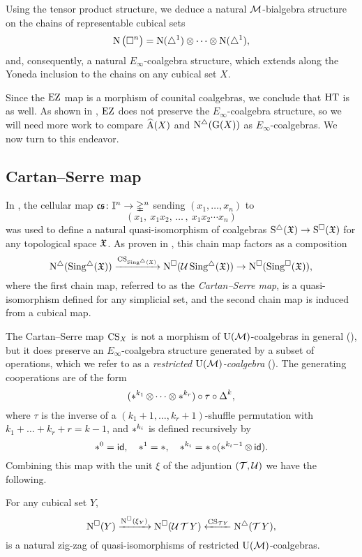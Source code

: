 Using the tensor product structure, we deduce a natural $\mathcal{M}$-bialgebra structure on the chains of representable cubical sets
\[
\operatorname{N}\big(\square^n\big) =
\operatorname{N}(\triangle^1) \otimes\dotsb\otimes \operatorname{N}(\triangle^1),
\]
and, consequently, a natural $E_\infty$-coalgebra structure, which extends along the Yoneda inclusion to the chains on any cubical set $X$.

Since the $\operatorname{EZ}$ map is a morphism of counital coalgebras, we conclude that $\operatorname{HT}$ is as well.
As shown in \cite[$\S$5.4]{medina2022cube_einfty}, $\operatorname{EZ}$ does not preserve the $E_\infty$-coalgebra structure, so we will need more work to compare $\operatorname{\widehat{A}}(X)$ and $\operatorname{N^{\triangle}}(\operatorname{G}(X))$ as $E_\infty$-coalgebras.
We now turn to this endeavor.

\subsection{Cartan--Serre map}

In \cite[p.442]{serre1951homologie}, the cellular map $\operatorname{\mathfrak{cs}} \colon \mathbb{I}^n \to \mathbb{\Delta}^n$ sending
$(x_1, \dots, x_n)$ to
\[
(x_1,\ x_1 x_2, \, \dots \, , \ x_1 x_2 \dotsm x_n)
\]
was used to define a natural quasi-isomorphism of coalgebras $\operatorname{S^{\triangle}}(\mathfrak{X}) \to \operatorname{S^{\square}}(\mathfrak{X})$ for any topological space $\mathfrak{X}$.
As proven in \cite[\S5.7]{medina2022cube_einfty}, this chain map factors as a composition
\[
\operatorname{N^{\triangle}}(\operatorname{Sing^{\triangle}}(\mathfrak{X})) \xrightarrow{\operatorname{CS}_{\operatorname{Sing^{\triangle}}(\mathfrak{X})}}
\operatorname{N^{\square}}(\mathcal{U} \operatorname{Sing^{\triangle}}(\mathfrak{X})) \to
\operatorname{N^{\square}}(\operatorname{Sing^{\square}}(\mathfrak{X})),
\]
where the first chain map, referred to as the \textit{Cartan--Serre map}, is a quasi-isomorphism defined for any simplicial set, and the second chain map is induced from a cubical map.

The Cartan--Serre map $\operatorname{CS}_X$ is not a morphism of ${\operatorname{U}(\mathcal{M})}$-coalgebras in general (\cite[$\S$5.4]{medina2022cube_einfty}), but it does preserve an $E_\infty$-coalgebra structure generated by a subset of operations, which we refer to as a \textit{restricted ${\operatorname{U}(\mathcal{M})}$-coalgebra} (\cite[\S5.6]{medina2022cube_einfty}).
The generating cooperations are of the form
\[
(\operatorname{\ast}^{k_1} \otimes\dotsb\otimes \operatorname{\ast}^{k_r}) \circ \tau \circ \operatorname{\Delta}^{k},
\]
where $\tau$ is the inverse of a $(k_1+1,\dots,k_r+1)$-shuffle permutation with $k_1+\dots+k_r+r = k-1$, and $\operatorname{\ast}^{k_i}$ is defined recursively by
\[
\operatorname{\ast}^0 = \mathsf{id}, \quad \operatorname{\ast}^1 = \operatorname{\ast}, \quad \operatorname{\ast}^{k_i} = \operatorname{\ast} \circ (\operatorname{\ast}^{k_i-1} \otimes\, \mathsf{id}).
\]
Combining this map with the unit $\xi$ of the adjuntion $(\operatorname{\mathcal{T}}, \mathcal{U})$ we have the following.

\begin{lemma}
	For any cubical set $Y$,
	\[
	\operatorname{N^{\square}}(Y) \xrightarrow{\operatorname{N^{\square}}(\xi_Y)}
	\operatorname{N^{\square}}(\operatorname{\mathcal{U}}{\operatorname{\mathcal{T}} Y})
	\xleftarrow{\operatorname{CS}_{\mathcal{T} Y}} \operatorname{N^{\triangle}}(\operatorname{\mathcal{T}} Y),
	\]
	is a natural zig-zag of quasi-isomorphisms of restricted ${\operatorname{U}(\mathcal{M})}$-coalgebras.
\end{lemma}


